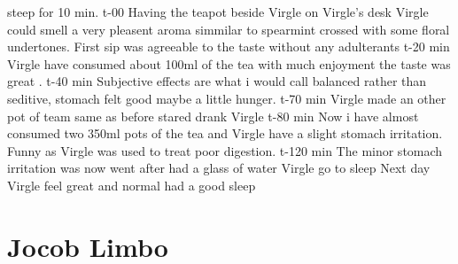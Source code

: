 \documentclass[12pt]{book}
\begin{document}
steep for 10 min. t-00 Having the teapot beside Virgle on Virgle's desk Virgle could smell a very pleasent aroma simmilar to spearmint crossed with some floral undertones. First sip was agreeable to the taste without any adulterants t-20 min Virgle have consumed about 100ml of the tea with much enjoyment the taste was great . t-40 min Subjective effects are what i would call balanced rather than seditive, stomach felt good maybe a little hunger. t-70 min Virgle made an other pot of team same as before stared drank Virgle t-80 min Now i have almost consumed two 350ml pots of the tea and Virgle have a slight stomach irritation. Funny as Virgle was used to treat poor digestion. t-120 min The minor stomach irritation was now went after had a glass of water Virgle go to sleep Next day Virgle feel great and normal had a good sleep



\chapter{Jocob Limbo}
\end{document}
